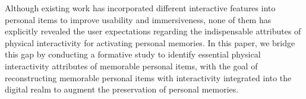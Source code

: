 Although existing work has incorporated different interactive features into personal items to improve usability and immersiveness, none of them has explicitly revealed the user expectations regarding the indispensable attributes of physical interactivity for activating personal memories.
In this paper, we bridge this gap by conducting a formative study to identify essential physical interactivity attributes of memorable personal items, with the goal of reconstructing memorable personal items with interactivity integrated into the digital realm to augment the preservation of personal memories. 








